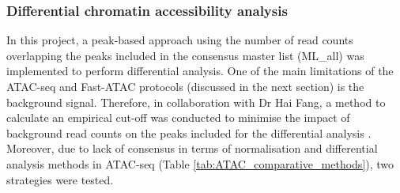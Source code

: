 

\subsubsection{Differential chromatin accessibility analysis}

In this project, a peak-based approach using the number of read counts overlapping the peaks included in the consensus master list (ML\_all) was implemented to perform differential analysis. One of the main limitations of the ATAC-seq and Fast-ATAC protocols (discussed in the next section) is the background signal. Therefore, in collaboration with Dr Hai Fang, a method to calculate an empirical cut-off was conducted to minimise the impact of background read counts on the peaks included for the differential analysis \parencite{Xinmin2005,Jonker2014}. Moreover, due to lack of consensus in terms of normalisation and differential analysis methods in ATAC-seq (Table \ref{tab:ATAC_comparative_methods}), two strategies were tested.


